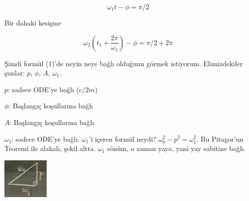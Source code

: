 \documentclass[12pt,fleqn]{article}\usepackage{../../common}
\begin{document}
$$ \omega_1 t - \phi = \pi / 2 $$

Bir dahaki kesişme

$$ \omega_2 (t_1 + \frac{2\pi}{\omega_1}) - \phi = \pi / 2 + 2\pi$$

Şimdi formül (1)'de neyin neye bağlı olduğunu görmek
istiyorum. Elimizdekiler şunlar: $p$, $\phi$, $A$, $\omega_1$.

$p$: sadece ODE'ye bağlı ($c/2m$)

$\phi$: Başlangıç koşullarına bağlı

$A$: Başlangıç koşullarına bağlı

$\omega_1$: sadece ODE'ye bağlı. $\omega_1$'i içeren formül neydi?
$\omega_0^2 - p^2  = \omega_1^2$. Bu Pitagor'un Teoremi ile alakalı, şekil altta.
$\omega_1$ sönüm, o zaman yaya, yani yay sabitine bağlı. 

\includegraphics[height=2cm]{10_4.png}
\end{document}
